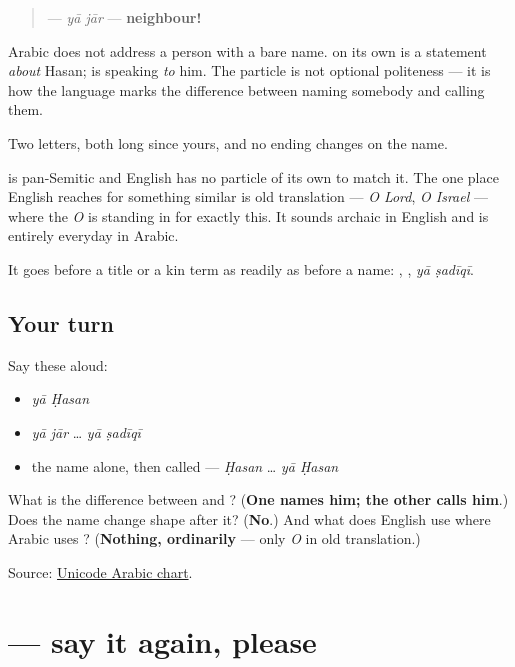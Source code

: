 \begin{quote}
\textbf{ } — \emph{yā jār} — \textbf{neighbour!}
\end{quote}

Arabic does not address a person with a bare name. \textbf{} on its own is a statement \emph{about} Hasan; \textbf{ } is speaking \emph{to} him. The particle is not optional politeness — it is how the language marks the difference between naming somebody and calling them.

Two letters, both long since yours, and no ending changes on the name.

\begin{cousinweb}
\textbf{} is pan-Semitic and English has no particle of its own to match it. The one place English reaches for something similar is old translation — \emph{O Lord}, \emph{O Israel} — where the \emph{O} is standing in for exactly this. It sounds archaic in English and is entirely everyday in Arabic.

It goes before a title or a kin term as readily as before a name: \textbf{ }, \textbf{ }, \emph{yā ṣadīqī}.
\end{cousinweb}

\subsection*{Your turn}
Say these aloud:

\begin{itemize}
\raggedright
  \item \emph{yā Ḥasan}
  \item \emph{yā jār} … \emph{yā ṣadīqī}
  \item the name alone, then called — \emph{Ḥasan} … \emph{yā Ḥasan}
\end{itemize}

\begin{tcolorbox}[breakable,colback=teal!4,colframe=teal!35!black,title={Before you move on}]
What is the difference between \textbf{} and \textbf{ }? (\textbf{One names him; the other calls him}.) Does the name change shape after it? (\textbf{No}.) And what does English use where Arabic uses \textbf{}? (\textbf{Nothing, ordinarily} — only \emph{O} in old translation.)

Source: \href{https://www.unicode.org/charts/PDF/U0600.pdf}{Unicode Arabic chart}.
\end{tcolorbox}
\section[\texorpdfstring{\ar{كرّر} \ar{من} \ar{فضلك} (karrir min faḍlik)}{كرّر من فضلك (karrir min faḍlik)}]{   — say it again, please}


